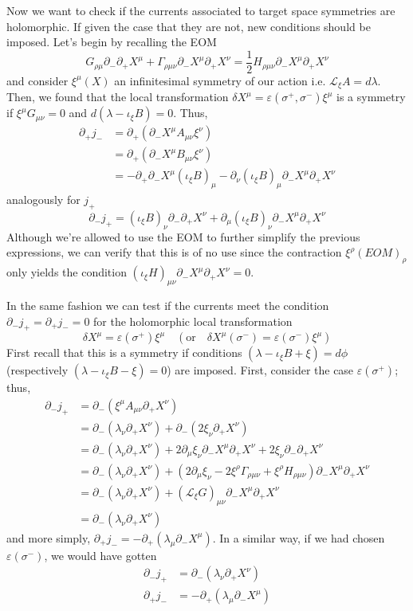 \documentclass[a4paper,12pt]{article}
\numberwithin{equation}{section}
\numberwithin{thm}{section}
\numberwithin{exm}{section}
\newcommand{\p}{\partial}
\newcommand{\lag}{\mathcal L}
\newcommand{\<}{{\langle}}
\renewcommand{\>}{{\rangle}}
\newcommand{\ve}{{\varepsilon}}
\newcommand{\G}{{\Gamma}}
\renewcommand{\l}{{\lambda}}
\newcommand{\m}{{\mu}}
\newcommand{\n}{{\nu}}
\renewcommand{\r}{{\rho}}
\newcommand{\s}{{\sigma}}
\begin{document}
Now we want to check if the currents associated to target space symmetries are holomorphic. If given the case that they are not, new conditions should be imposed. Let's begin by recalling the EOM
	\begin{equation}
	G_{\rho\mu}\p_-\p_+X^\mu+\Gamma_{\rho\mu\nu}\p_-X^\mu\p_+X^\nu=\frac{1}{2}H_{\rho\mu\nu}\p_-X^\mu\p_+X^\nu
	\end{equation}
and consider $\xi^\mu(X)$ an infinitesimal symmetry of our action i.e. $\lag_\xi A=d\lambda$. Then, we found that the local transformation $\delta X^\mu=\ve(\s^+,\s^-)\xi^\mu$ is a symmetry if $\xi^\mu G_{\mu\nu}=0$ and $d(\lambda-\iota_\xi B)=0$. Thus,
	\begin{align}
	\p_+j_-&=\p_+(\p_-X^\mu A_{\mu\nu} \xi^\nu) \nonumber \\
	&=\p_+(\p_-X^\mu B_{\mu\nu}\xi^\nu) \nonumber \\
	&=-\p_+\p_-X^\mu(\iota_\xi B)_\mu-\p_\nu(\iota_\xi B)_\mu\p_-X^\mu\p_+X^\nu
	\end{align}
analogously for $j_+$
	\begin{equation}
	\p_-j_+=(\iota_\xi B)_\nu \p_-\p_+X^\nu+ \p_\mu(\iota_\xi B)_\nu\p_-X^\mu\p_+X^\nu
	\end{equation}
Although we're allowed to use the EOM to further simplify the previous expressions, we can verify that this is of no use since the contraction $\xi^\rho (EOM)_\rho$ only yields the condition $(\iota_\xi H)_{\mu\nu}\p_-X^\mu\p_+X^\nu=0$.

In the same fashion we can test if the currents meet the condition $\p_-j_+=\p_+j_-=0$ for the holomorphic local transformation
	\begin{equation}
	\delta X^\mu=\ve(\s^+)\xi^\mu\quad(\text{or}\quad\delta X^\mu(\s^-)=\ve(\s^-)\xi^\mu)
	\end{equation}
First recall that this is a symmetry if conditions $(\lambda-\iota_\xi B+\xi)=d\phi$ (respectively $(\lambda-\iota_\xi B-\xi)=0$) are imposed. First, consider the case $\ve(\s^+)$; thus,
	\begin{align}
	\p_- j_+ & = \p_-(\xi^\m A_{\m\n}\p_+X^\n) \nonumber \\
	&=\p_-(\l_\n\p_+X^\n) + \p_-(2\xi_\n\p_+X^\n) \nonumber \\
	&=\p_-(\l_\n\p_+X^\n) + 2\p_\m\xi_\n\p_-X^\m\p_+X^\n + 2\xi_\n\p_-\p_+X^\n \nonumber \\
	&=\p_-(\l_\n\p_+X^\n) + (2\p_\m\xi_\n - 2\xi^\r \G_{\r\m\n} + \xi^\r H_{\r\m\n})\p_-X^\m\p_+X^\n \nonumber \\
	&=\p_-(\l_\n\p_+X^\n) + (\lag_\xi G)_{\m\n}\p_-X^\m\p_+X^\n \nonumber \\
	&=\p_-(\l_\n\p_+X^\n)
	\end{align}
and more simply, $\p_+j_-=-\p_+(\l_\m \p_- X^\m)$. In a similar way, if we had chosen $\ve(\s^-)$, we would have gotten
	\begin{align}
	\p_-j_+ & =\p_-(\l_\n\p_+X^\n) \\
	\p_+j_- & =-\p_+(\l_\m\p_-X^\m)
	\end{align}
\end{document}
